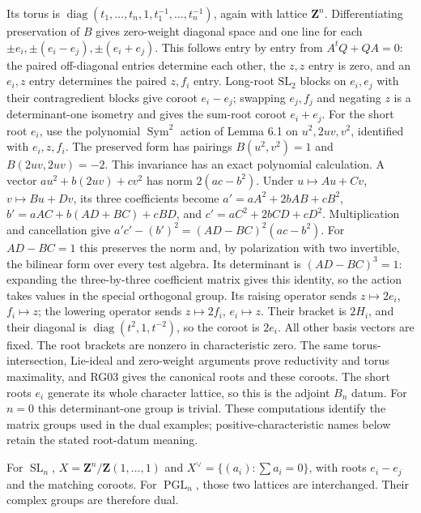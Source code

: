 \documentclass[11pt,a4paper,openany]{report}
\begin{document}
Its torus is \(\operatorname{diag}(t_1,\ldots,t_n,1,t_1^{-1},\ldots,t_n^{-1})\), again with lattice \(\mathbf Z^n\). Differentiating preservation of \(B\) gives zero-weight diagonal space and one line for each \(\pm e_i,\pm(e_i-e_j),\pm(e_i+e_j)\). This follows entry by entry from \(A^tQ+QA=0\): the paired off-diagonal entries determine each other, the \(z,z\) entry is zero, and an \(e_i,z\) entry determines the paired \(z,f_i\) entry. Long-root \(\mathrm{SL}_2\) blocks on \(e_i,e_j\) with their contragredient blocks give coroot \(e_i-e_j\); swapping \(e_j,f_j\) and negating \(z\) is a determinant-one isometry and gives the sum-root coroot \(e_i+e_j\). For the short root \(e_i\), use the polynomial \(\operatorname{Sym}^2\) action of Lemma 6.1 on \(u^2,2uv,v^2\), identified with \(e_i,z,f_i\). The preserved form has pairings \(B(u^2,v^2)=1\) and \(B(2uv,2uv)=-2\). This invariance has an exact polynomial calculation. A vector \(a u^2+b(2uv)+c v^2\) has norm \(2(ac-b^2)\). Under \(u\mapsto Au+Cv\), \(v\mapsto Bu+Dv\), its three coefficients become \(a\prime=aA^2+2bAB+cB^2\), \(b\prime=aAC+b(AD+BC)+cBD\), and \(c\prime=aC^2+2bCD+cD^2\). Multiplication and cancellation give \(a\prime c\prime-(b\prime)^2=(AD-BC)^2(ac-b^2)\). For \(AD-BC=1\) this preserves the norm and, by polarization with two invertible, the bilinear form over every test algebra. Its determinant is \((AD-BC)^3=1\): expanding the three-by-three coefficient matrix gives this identity, so the action takes values in the special orthogonal group. Its raising operator sends \(z\mapsto2e_i\), \(f_i\mapsto z\); the lowering operator sends \(z\mapsto2f_i\), \(e_i\mapsto z\). Their bracket is \(2H_i\), and their diagonal is \(\operatorname{diag}(t^2,1,t^{-2})\), so the coroot is \(2e_i\). All other basis vectors are fixed. The root brackets are nonzero in characteristic zero. The same torus-intersection, Lie-ideal and zero-weight arguments prove reductivity and torus maximality, and RG03 gives the canonical roots and these coroots. The short roots \(e_i\) generate its whole character lattice, so this is the adjoint \(B_n\) datum. For \(n=0\) this determinant-one group is trivial. These computations identify the matrix groups used in the dual examples; positive-characteristic names below retain the stated root-datum meaning.

For \(\operatorname{SL}_n\), \(X=\mathbf Z^n/\mathbf Z(1,\ldots,1)\) and \(X^\vee=\{(a_i):\sum a_i=0\}\), with roots \(e_i-e_j\) and the matching coroots. For \(\operatorname{PGL}_n\), those two lattices are interchanged. Their complex groups are therefore dual.
\end{document}
